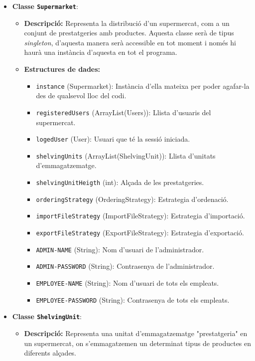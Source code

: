 \documentclass[a4paper,12pt]{report}
\begin{document}
	\begin{itemize}
		\item \textbf{Classe \texttt{Supermarket}}:
		\begin{itemize}
			\item \textbf{Descripció:} Representa la distribució d'un supermercat, com a un conjunt de prestatgeries amb productes. Aquesta classe serà de tipus \textit{singleton}, d'aquesta manera serà accessible en tot moment i només hi haurà una instància d'aquesta en tot el programa.
			\item \textbf{Estructures de dades:}
			\begin{itemize}
				\item \texttt{instance} (Supermarket): Instància d'ella mateixa per poder agafar-la des de qualsevol lloc del codi.
				\item \texttt{registeredUsers} (ArrayList(Users)): Llista d'usuaris del supermercat.
				\item \texttt{logedUser} (User): Usuari que té la sessió iniciada.
				\item \texttt{shelvingUnits} (ArrayList(ShelvingUnit)): Llista d'unitats d'emmagatzematge.
				\item \texttt{shelvingUnitHeigth} (int): Alçada de les prestatgeries.
				\item \texttt{orderingStrategy} (OrderingStrategy): Estrategia d'ordenació.
				\item \texttt{importFileStrategy} (ImportFileStrategy): Estrategia d'importació.
				\item \texttt{exportFileStrategy} (ExportFileStrategy): Estrategia d'exportació.
				\item \texttt{ADMIN-NAME} (String): Nom d'usuari de l'administrador.
				\item \texttt{ADMIN-PASSWORD} (String): Contrasenya de l'administrador.
				\item \texttt{EMPLOYEE-NAME} (String): Nom d'usuari de tots els empleats.
				\item \texttt{EMPLOYEE-PASSWORD} (String): Contrasenya de tots els empleats.
			\end{itemize}
		\end{itemize}
		\item \textbf{Classe \texttt{ShelvingUnit}}:
		\begin{itemize}
			\item \textbf{Descripció:} Representa una unitat d'emmagatzematge "prestatgeria" en un supermercat, on s'emmagatzemen un determinat tipus de productes en diferents alçades.

\end{itemize}
\end{itemize}
\end{document}
